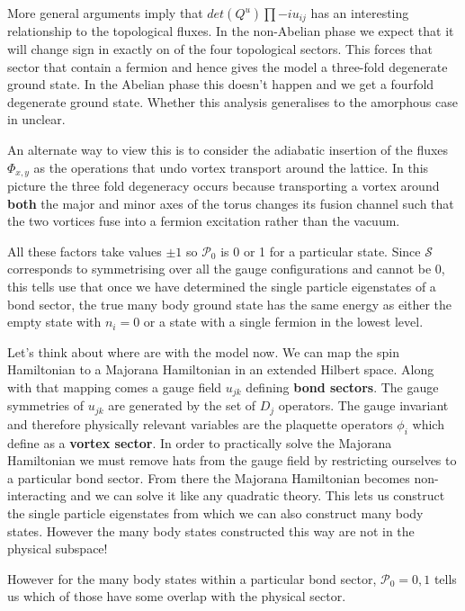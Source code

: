 More general arguments\autocite{chungExplicitMonodromyMoore2007,oshikawaTopologicalDegeneracyNonAbelian2007} imply that \(det(Q^u) \prod -i u_{ij}\) has an interesting relationship to the topological fluxes. In the non-Abelian phase we expect that it will change sign in exactly on of the four topological sectors. This forces that sector that contain a fermion and hence gives the model a three-fold degenerate ground state. In the Abelian phase this doesn't happen and we get a fourfold degenerate ground state. Whether this analysis generalises to the amorphous case in unclear.

An alternate way to view this is to consider the adiabatic insertion of the fluxes \(\Phi_{x,y}\) as the operations that undo vortex transport around the lattice. In this picture the three fold degeneracy occurs because transporting a vortex around \textbf{both} the major and minor axes of the torus changes its fusion channel such that the two vortices fuse into a fermion excitation rather than the vacuum.

All these factors take values \(\pm 1\) so \(\mathcal{P}_0\) is 0 or 1 for a particular state. Since \(\mathcal{S}\) corresponds to symmetrising over all the gauge configurations and cannot be 0, this tells use that once we have determined the single particle eigenstates of a bond sector, the true many body ground state has the same energy as either the empty state with \(n_i = 0\) or a state with a single fermion in the lowest level.

Let's think about where are with the model now. We can map the spin Hamiltonian to a Majorana Hamiltonian in an extended Hilbert space. Along with that mapping comes a gauge field \(u_{jk}\) defining \textbf{bond sectors}. The gauge symmetries of \(u_{jk}\) are generated by the set of \(D_j\) operators. The gauge invariant and therefore physically relevant variables are the plaquette operators \(\phi_i\) which define as a \textbf{vortex sector}. In order to practically solve the Majorana Hamiltonian we must remove hats from the gauge field by restricting ourselves to a particular bond sector. From there the Majorana Hamiltonian becomes non-interacting and we can solve it like any quadratic theory. This lets us construct the single particle eigenstates from which we can also construct many body states. However the many body states constructed this way are not in the physical subspace!

However for the many body states within a particular bond sector, \(\mathcal{P}_0 = 0,1\) tells us which of those have some overlap with the physical sector.

